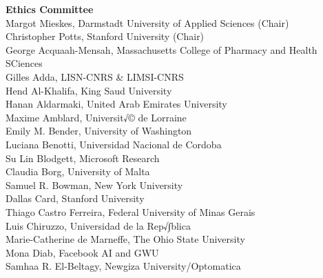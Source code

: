 {\bf Ethics Committee} \\
\hspace*{0.2in} Margot Mieskes, Darmstadt University of Applied Sciences (Chair)\\
\hspace*{0.2in} Christopher Potts, Stanford University (Chair)\\
\hspace*{0.2in} George Acquaah-Mensah, Massachusetts College of Pharmacy and Health SCiences\\
\hspace*{0.2in} Gilles Adda, LISN-CNRS \& LIMSI-CNRS\\
\hspace*{0.2in} Hend Al-Khalifa, King Saud University\\
\hspace*{0.2in} Hanan Aldarmaki, United Arab Emirates University\\
\hspace*{0.2in} Maxime Amblard, Universit√© de Lorraine\\
\hspace*{0.2in} Emily M. Bender, University of Washington\\
\hspace*{0.2in} Luciana Benotti, Universidad Nacional de Cordoba\\
\hspace*{0.2in} Su Lin Blodgett, Microsoft Research\\
\hspace*{0.2in} Claudia Borg, University of Malta\\
\hspace*{0.2in} Samuel R. Bowman, New York University\\
\hspace*{0.2in} Dallas Card, Stanford University\\
\hspace*{0.2in} Thiago Castro Ferreira, Federal University of Minas Gerais\\
\hspace*{0.2in} Luis Chiruzzo, Universidad de la Rep√∫blica\\
\hspace*{0.2in} Marie-Catherine de Marneffe, The Ohio State University\\
\hspace*{0.2in} Mona Diab, Facebook AI and GWU\\
\hspace*{0.2in} Samhaa R. El-Beltagy, Newgiza University/Optomatica\\
